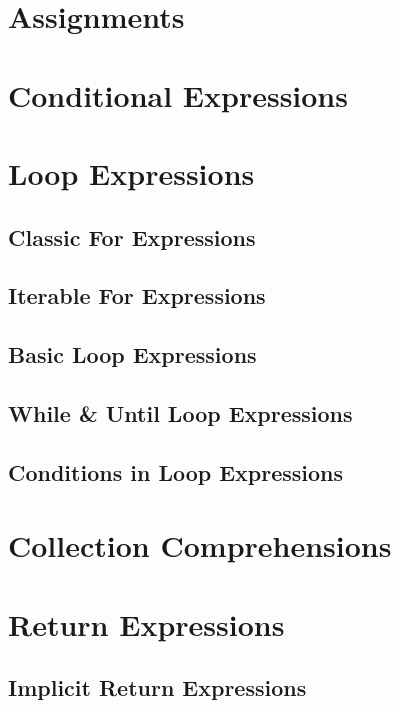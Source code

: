 \section{Assignments}

\section{Conditional Expressions}

\section{Loop Expressions}

\subsection{Classic For Expressions}

\subsection{Iterable For Expressions}

\subsection{Basic Loop Expressions}

\subsection{While \& Until Loop Expressions}

\subsection{Conditions in Loop Expressions}

\section{Collection Comprehensions}

\section{Return Expressions}

\subsection{Implicit Return Expressions}

